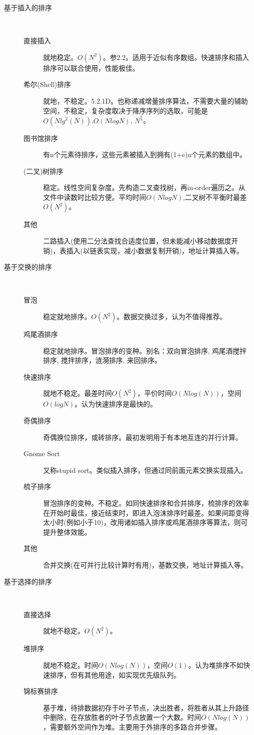 \begin{description}
    \item[基于插入的排序] 
        \hfill \\
	\begin{description}
	    \item[直接插入]就地稳定。$O(N^2)$。参\cite{ita}2.2。适用于近似有序数组。快速排序和插入排序可以联合使用，性能极佳。
	    \item[希尔(Shell)排序]就地，不稳定。\cite{acp}5.2.1D。也称递减增量排序算法，不需要大量的辅助空间，不稳定，复杂度取决于降序序列的选取，可能是$O(Nlg^{2}(N))$,$O(NlogN)$, $N^{\frac{6}{5}}$。
	    \item[图书馆排序]有n个元素待排序，这些元素被插入到拥有(1+e)n个元素的数组中。
	    \item[(二叉)树排序]稳定。线性空间复杂度。先构造二叉查找树，再in-order遍历之。从文件中读数时比较方便。平均时间$O(NlogN)$,二叉树不平衡时最差$O(N^2)$。
	    \item[其他]二路插入(使用二分法查找合适度位置，但未能减小移动数据度开销)，表插入(以链表实现，减小数据复制开销)，地址计算插入等。
	\end{description}
    \item[基于交换的排序] 
        \hfill \\
	\begin{description}
	    \item[冒泡]稳定就地排序。$O(N^2)$。数据交换过多，\cite{acp}认为不值得推荐。
	    \item[鸡尾酒排序]稳定就地排序。冒泡排序的变种。别名：双向冒泡排序, 鸡尾酒搅拌排序, 搅拌排序，涟漪排序, 来回排序。
	    \item[快速排序]就地不稳定。最差时间$O(N^2)$，平价时间$O(Nlog(N))$，空间$O(logN)$。\cite{sedgewick}认为快速排序是最快的。
	    \item[奇偶排序]奇偶换位排序，或砖排序。最初发明用于有本地互连的并行计算。
	    \item[Gnome Sort]又称stupid sort。类似插入排序，但通过同前面元素交换实现插入。
	    \item[梳子排序]冒泡排序的变种。不稳定。如同快速排序和合并排序，梳排序的效率在开始时最佳，接近结束时，即进入泡沫排序时最差。如果间距变得太小时(例如小于10)，改用诸如插入排序或鸡尾酒排序等算法，则可提升整体效能。
	    \item[其他]合并交换(在可并行比较计算时有用)，基数交换，地址计算插入等。
	\end{description}
    \item[基于选择的排序]
        \hfill \\
	\begin{description}
	    \item[直接选择]就地不稳定。$O(N^2)$。
	    \item[堆排序]就地不稳定。时间$O(Nlog(N))$，空间$O(1)$。\cite{ita}认为堆排序不如快速排序，但有其他用途，如实现优先级队列。	
	    \item[锦标赛排序]基于堆，待排数据初存于叶子节点，决出胜者，将胜者从其上升路径中删除，在存放胜者的叶子节点放置一个大数。时间$O(Nlog(N))$，需要额外空间作为堆。主要用于外排序的多路合并步骤。


\end{description}
\end{description}
